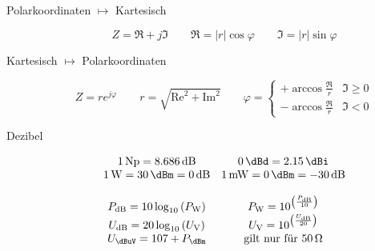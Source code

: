 \begin{description}
\item[Polarkoordinaten $\longmapsto$ Kartesisch]
\begin{equation*}
Z = \Re + j\Im \qquad \Re = |r| \cos \varphi \qquad \Im = |r| \sin \varphi
\end{equation*}

\item[Kartesisch $\longmapsto$ Polarkoordinaten]
\begin{equation*}
Z = r e^{j \varphi} \qquad r = \sqrt{\text{Re}^2 + \text{Im}^2} \qquad \varphi = \left\{ \begin{array}{cc}
+\arccos \frac{\Re}{r} & \Im \geq 0 \\ 
-\arccos \frac{\Re}{r} & \Im < 0
\end{array} \right.
\end{equation*}

\item[Dezibel]
\begin{equation*}
\begin{array}{cc}
\SI{1}{\neper} = \SI{8,686}{\dB} & \SI{0}{\dBd} = \SI{2,15}{\dBi} \\ 
\SI{1}{\watt} = \SI{30}{\dBm} = \SI{0}{\dB} & \SI{1}{\milli\watt} = \SI{0}{\dBm} = \SI{-30}{\dB} \\
 & \\
P_{\si{\dB}} = 10\log_{10}\left( P_{\si{\watt}} \right) & P_{\si{\watt}} = 10^{\left( \frac{P_{\si{\dB}}}{10} \right)} \\
U_{\si{\dB}} = 20\log_{10}\left( U_{\si{\volt}} \right) & U_{\si{\volt}} = 10^{\left( \frac{U_{\si{\dB}}}{20} \right)} \\
U_{\si{\dBuV}} = 107 + P_{\si{\dBm}} & \text{gilt nur für \SI{50}{\ohm}}
\end{array}
\end{equation*}


\end{description}
